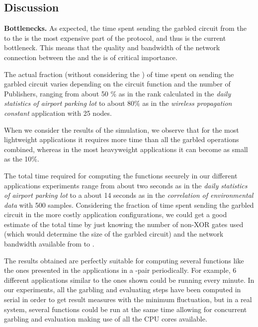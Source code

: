 

\subsection{Discussion}

\noindent\textbf{Bottlenecks.}  As expected, the time spent sending the garbled
circuit from the \garbler to the \broker is the most expensive part of the
protocol, and thus is the current bottleneck.  This means that the quality and
bandwidth of the network connection between the \broker and the \garbler is of
critical importance.

The actual fraction (without considering the \PSI) of time spent on sending the
garbled circuit varies depending on the circuit function and the number of
Publishers, ranging from about 50 \% as in the rank calculated in the
\emph{daily statistics of airport parking lot} to about 80\% as in the
\emph{wireless propagation constant} application with 25 nodes.

When we consider the results of the \PSI simulation, we observe that for the
most lightweight applications it requires more time than all the garbled
operations combined, whereas in the most heavyweight applications it can become
as small as the 10\%.

The total time required for computing the functions securely in our different
applications experiments range from about two seconds as in the \emph{daily
statistics of airport parking lot} to a about 14 seconds as in the
\emph{correlation of environmental data} with 500 samples.  Considering the
fraction of time spent sending the garbled circuit in the more costly
application configurations, we could get a good estimate of the total time by
just knowing the number of non-XOR gates used (which would determine the size
of the garbled circuit) and the network bandwidth available from \broker to
\garbler.

The results obtained are perfectly suitable for computing several functions
like the ones presented in the applications in a \broker-\garbler pair
periodically.  For example, 6 different applications similar to the ones shown
could be running every minute.  In our experiments, all the garbling and
evaluating steps have been computed in serial in order to get result measures
with the minimum fluctuation, but in a real system, several functions could be
run at the same time allowing for concurrent garbling and evaluation making use
of all the CPU cores available.

